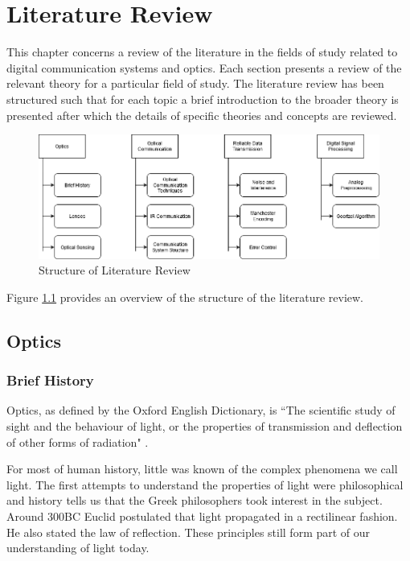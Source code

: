 \chapter{Literature Review}
\label{ch_literature}

This chapter concerns a review of the literature in the fields of study related to digital communication systems and optics. Each section presents a review of the relevant theory for a particular field of study. The literature review has been structured such that for each topic a brief introduction to the broader theory is presented after which the details of specific theories and concepts are reviewed.

\begin{figure}[H]
	\centering
	\includegraphics[width=\linewidth]{figures/litreview/litreview_overview.png}
	\caption{Structure of Literature Review}
	\label{fig:litreview_overview}
\end{figure}

Figure \ref{fig:litreview_overview} provides an overview of the structure of the literature review.

\section{Optics}

\subsection{Brief History}

Optics, as defined by the Oxford English Dictionary, is ``The scientific study of sight and the behaviour of light, or the properties of transmission and deflection of other forms of radiation" \cite{oroptics2010}.

For most of human history, little was known of the complex phenomena we call light. The first attempts to understand the properties of light were philosophical and history tells us that the Greek philosophers took interest in the subject. Around 300BC Euclid postulated that light propagated in a rectilinear fashion. He also stated the law of reflection. These principles still form part of our understanding of light today. \cite{Vohnsen2004}

